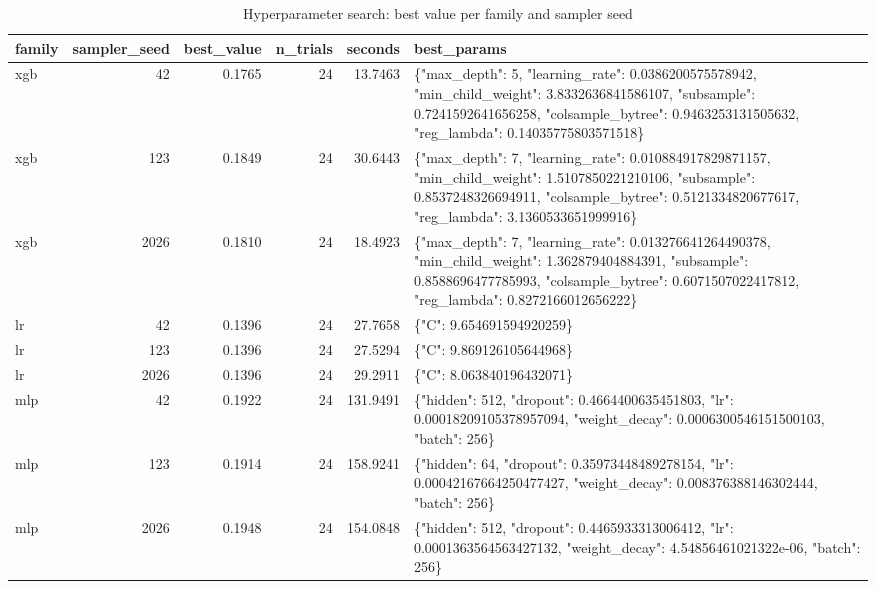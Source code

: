 \begin{table}
\caption{Hyperparameter search: best value per family and sampler seed}
\label{tab:tab_tuning_trials}
\begin{tabular}{lrrrrl}
\toprule
family & sampler\_seed & best\_value & n\_trials & seconds & best\_params \\
\midrule
xgb & 42 & 0.1765 & 24 & 13.7463 & \{"max\_depth": 5, "learning\_rate": 0.0386200575578942, "min\_child\_weight": 3.8332636841586107, "subsample": 0.7241592641656258, "colsample\_bytree": 0.9463253131505632, "reg\_lambda": 0.14035775803571518\} \\
xgb & 123 & 0.1849 & 24 & 30.6443 & \{"max\_depth": 7, "learning\_rate": 0.010884917829871157, "min\_child\_weight": 1.5107850221210106, "subsample": 0.8537248326694911, "colsample\_bytree": 0.5121334820677617, "reg\_lambda": 3.1360533651999916\} \\
xgb & 2026 & 0.1810 & 24 & 18.4923 & \{"max\_depth": 7, "learning\_rate": 0.013276641264490378, "min\_child\_weight": 1.362879404884391, "subsample": 0.8588696477785993, "colsample\_bytree": 0.6071507022417812, "reg\_lambda": 0.8272166012656222\} \\
lr & 42 & 0.1396 & 24 & 27.7658 & \{"C": 9.654691594920259\} \\
lr & 123 & 0.1396 & 24 & 27.5294 & \{"C": 9.869126105644968\} \\
lr & 2026 & 0.1396 & 24 & 29.2911 & \{"C": 8.063840196432071\} \\
mlp & 42 & 0.1922 & 24 & 131.9491 & \{"hidden": 512, "dropout": 0.4664400635451803, "lr": 0.00018209105378957094, "weight\_decay": 0.0006300546151500103, "batch": 256\} \\
mlp & 123 & 0.1914 & 24 & 158.9241 & \{"hidden": 64, "dropout": 0.35973448489278154, "lr": 0.00042167664250477427, "weight\_decay": 0.008376388146302444, "batch": 256\} \\
mlp & 2026 & 0.1948 & 24 & 154.0848 & \{"hidden": 512, "dropout": 0.4465933313006412, "lr": 0.0001363564563427132, "weight\_decay": 4.54856461021322e-06, "batch": 256\} \\
\bottomrule
\end{tabular}
\end{table}
